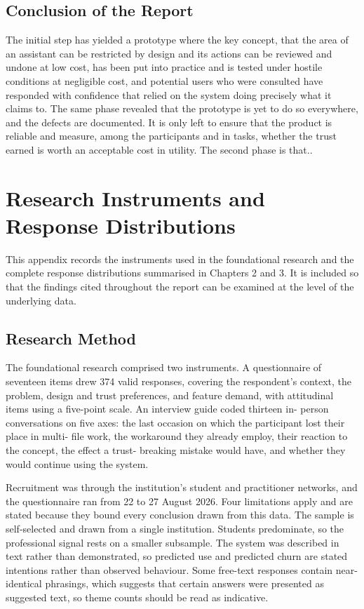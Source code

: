 \documentclass{FastFyp}
\begin{document}
\section{Conclusion of the Report}
The initial step has yielded a prototype where the key concept, that the area of an assistant can be restricted by design and its actions can be reviewed and undone at low cost, has been put into practice and is tested under hostile conditions at negligible cost, and potential users who were consulted have responded with confidence that relied on the system doing precisely what it claims to. The same phase revealed that the prototype is yet to do so everywhere, and the defects are documented. It is only left to ensure that the product is reliable and measure, among the participants and in tasks, whether the trust earned is worth an acceptable cost in utility. The second phase is that..


{


}

\appendix
\chapter{Research Instruments and Response Distributions}
This appendix records the instruments used in the foundational research and the complete response distributions summarised in Chapters 2 and 3. It is included so that the findings cited throughout the report can be examined at the level of the underlying data.

\section{Research Method}
The foundational research comprised two instruments. A questionnaire of seventeen items drew 374 valid responses, covering the respondent's context, the problem, design and trust preferences, and feature demand, with attitudinal items using a five-point scale. An interview guide coded thirteen in- person conversations on five axes: the last occasion on which the participant lost their place in multi- file work, the workaround they already employ, their reaction to the concept, the effect a trust- breaking mistake would have, and whether they would continue using the system.

Recruitment was through the institution's student and practitioner networks, and the questionnaire ran from 22 to 27 August 2026. Four limitations apply and are stated because they bound every conclusion drawn from this data. The sample is self-selected and drawn from a single institution. Students predominate, so the professional signal rests on a smaller subsample. The system was described in text rather than demonstrated, so predicted use and predicted churn are stated intentions rather than observed behaviour. Some free-text responses contain near-identical phrasings, which suggests that certain answers were presented as suggested text, so theme counts should be read as indicative.
\end{document}
